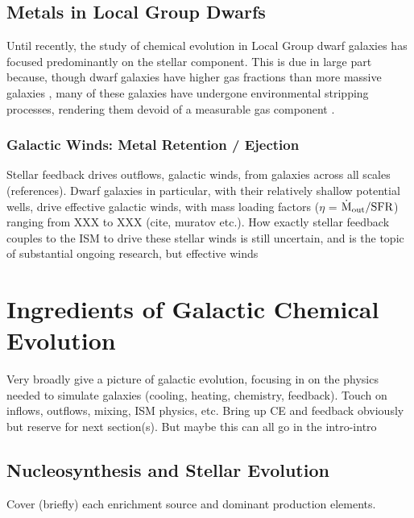 \subsection{Metals in Local Group Dwarfs}

Until recently, the study of chemical evolution in Local Group dwarf galaxies has focused predominantly on the stellar component. This is due in large part because, though dwarf galaxies have higher gas fractions than more massive galaxies \citep{Geha2006}, many of these galaxies have undergone environmental stripping processes, rendering them devoid of a measurable gas component \citep{GrcevichPutman2009}. 


\subsubsection{Galactic Winds: Metal Retention / Ejection}

Stellar feedback drives outflows, galactic winds, from galaxies across all scales (references). Dwarf galaxies in particular, with their relatively shallow potential wells, drive effective galactic winds, with mass loading factors ($\eta$ = $\dot{\rm{M}}_{\rm out} / {\rm SFR}$) ranging from XXX to XXX (cite, muratov etc.). How exactly stellar feedback couples to the ISM to drive these stellar winds is still uncertain, and is the topic of substantial ongoing research, but effective winds 


\section{Ingredients of Galactic Chemical Evolution}

Very broadly give a picture of galactic evolution, focusing in on the physics needed to simulate galaxies (cooling, heating, chemistry, feedback). Touch on inflows, outflows, mixing, ISM physics, etc. Bring up CE and feedback obviously but reserve for next section(s). But maybe this can all go in the intro-intro

\subsection{Nucleosynthesis and Stellar Evolution}

Cover (briefly) each enrichment source and dominant production elements. 


